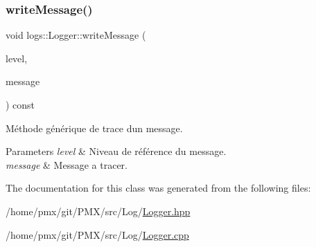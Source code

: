 \subsubsection{\texorpdfstring{write\+Message()}{writeMessage()}}
{\footnotesize\ttfamily void logs\+::\+Logger\+::write\+Message (\begin{DoxyParamCaption}\item[{const \hyperlink{classlogs_1_1Level}{logs\+::\+Level} \&}]{level,  }\item[{const std\+::string \&}]{message }\end{DoxyParamCaption}) const}



Méthode générique de trace d\textquotesingle{}un message. 


\begin{DoxyParams}{Parameters}
{\em level} & Niveau de référence du message. \\
\hline
{\em message} & Message a tracer. \\
\hline
\end{DoxyParams}


The documentation for this class was generated from the following files\+:\begin{DoxyCompactItemize}
\item 
/home/pmx/git/\+P\+M\+X/src/\+Log/\hyperlink{Logger_8hpp}{Logger.\+hpp}\item 
/home/pmx/git/\+P\+M\+X/src/\+Log/\hyperlink{Logger_8cpp}{Logger.\+cpp}\end{DoxyCompactItemize}
